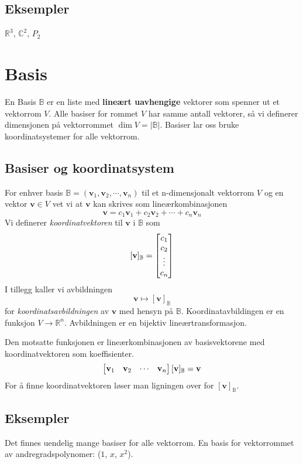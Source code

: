 \documentclass[12pt,a4paper,norsk]{article}
\makeatletter
\newcommand{\R}{\mathbb{R}}
\newcommand{\C}{\mathbb{C}}
\newcommand{\B}{\mathbb{B}}
\newcommand{\mat}[2]{\left[\begin{array}{@{}#1@{}}#2\end{array}\right]}
\newcommand{\vv}{\textbf{v}}
\makeatother
\begin{document}
\subsection{Eksempler}
$\R^{3}$, $\C^{2}$, $P_{2}$

\section{Basis}
En Basis $\B$ er en liste med \textbf{lineært uavhengige} vektorer som spenner ut et
vektorrom $V$. Alle basiser for rommet $V$ har samme antall vektorer, så vi
definerer dimensjonen på vektorrommet $\dim{V} = |\B|$.
Basiser lar oss bruke koordinatsystemer for alle vektorrom.

\subsection{Basiser og koordinatsystem}
For enhver basis $\B=(\vv_1, \vv_2, \cdots, \vv_n)$ til et n-dimensjonalt vektorrom $V$
og en vektor $\vv \in V$ vet vi at $\vv$ kan skrives som lineærkombinasjonen
\[\vv=c_1\vv_1 + c_2\vv_2 + \cdots + c_n\vv_n\]
Vi definerer \textit{koordinatvektoren} til $\vv$ i $\B$ som
\[[\vv]_\B=\mat{c}{c_1\\c_2\\ \vdots \\ c_n}\]
I tillegg kaller vi avbildningen 
\[\vv \mapsto [\vv]_\B\]
for \textit{koordinatsavbildningen} av $\vv$ med hensyn på $\B$.
Koordinatavbildingen er en funksjon $V \rightarrow \R^n$.
Avbildningen er en bijektiv lineærtransformasjon.

Den motsatte funksjonen er lineærkombinasjonen av basisvektorene
med koordinatvektoren som koeffisienter.
\[\mat{cccc}{\vv_1 & \vv_2 & \cdots & \vv_n}[\vv]_{\B} = \vv\]
For å finne koordinatvektoren løser man ligningen over for $[\vv]_{\B}$.

\subsection{Eksempler}
Det finnes uendelig mange basiser for alle vektorrom.
En basis for vektorrommet av andregradspolynomer: ($1$, $x$, $x^2$).
\end{document}
